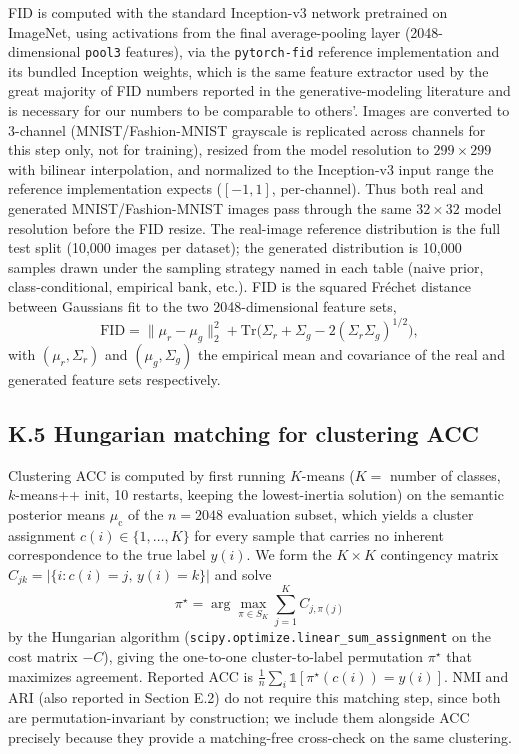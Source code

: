 \documentclass[letterpaper]{article} %
\newcommand{\muc}{\mu_{\mathrm{c}}}
\begin{document}
FID is computed with the standard Inception-v3 network
\citep{szegedy2016rethinking} pretrained on ImageNet, using activations from
the final average-pooling layer (2048-dimensional \texttt{pool3} features),
via the \texttt{pytorch-fid} reference implementation and its bundled
Inception weights, which is the same feature extractor used by the great
majority of FID numbers reported in the generative-modeling literature and is
necessary for our numbers to be comparable to others'. Images are converted
to 3-channel (MNIST/Fashion-MNIST grayscale is replicated across channels for
this step only, not for training), resized from the model resolution to
$299\times299$ with bilinear interpolation, and normalized to the
Inception-v3 input range the reference implementation expects
($[-1,1]$, per-channel). Thus both real and generated MNIST/Fashion-MNIST
images pass through the same $32\times32$ model resolution before the FID
resize. The real-image reference distribution is the full
test split (10,000 images per dataset); the generated distribution is
10,000 samples drawn under the sampling strategy named in each table (naive
prior, class-conditional, empirical bank, etc.). FID is the squared
Fr\'echet distance between Gaussians fit to the two 2048-dimensional feature
sets,
\[
\mathrm{FID}=\|\mu_r-\mu_g\|_2^2+\mathrm{Tr}\bigl(\Sigma_r+\Sigma_g-2(\Sigma_r\Sigma_g)^{1/2}\bigr),
\]
with $(\mu_r,\Sigma_r)$ and $(\mu_g,\Sigma_g)$ the empirical mean and
covariance of the real and generated feature sets respectively.

\subsection{K.5 Hungarian matching for clustering ACC}

Clustering ACC is computed by first running $K$-means ($K{=}$ number of
classes, $k$-means++ init, 10 restarts, keeping the lowest-inertia solution)
on the semantic posterior means $\muc$ of the $n{=}2048$ evaluation subset,
which yields a cluster assignment $c(i)\in\{1,\dots,K\}$ for every sample
that carries no inherent correspondence to the true label $y(i)$. We form the
$K\times K$ contingency matrix $C_{jk}=|\{i:c(i){=}j,\,y(i){=}k\}|$ and solve
\[
\pi^\star=\arg\max_{\pi\in S_K}\sum_{j=1}^K C_{j,\pi(j)}
\]
by the Hungarian algorithm (\texttt{scipy.optimize.linear\_sum\_assignment}
on the cost matrix $-C$), giving the one-to-one cluster-to-label permutation
$\pi^\star$ that maximizes agreement. Reported ACC is
$\frac1n\sum_i \mathbb{1}[\pi^\star(c(i)){=}y(i)]$. NMI and ARI (also
reported in Section E.2) do not require this matching step, since both are
permutation-invariant by construction; we include them alongside ACC
precisely because they provide a matching-free cross-check on the same
clustering.
\end{document}
